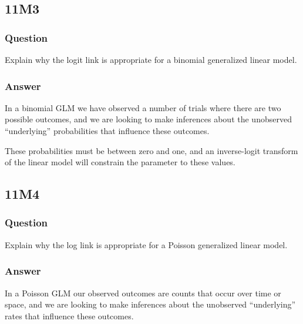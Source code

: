 \documentclass[
]{book}
\begin{document}
\hypertarget{m3-6}{%
\subsection*{11M3}\label{m3-6}}

\hypertarget{question-87}{%
\subsubsection*{Question}\label{question-87}}

Explain why the logit link is appropriate for a binomial generalized linear model.

\hypertarget{answer-87}{%
\subsubsection*{Answer}\label{answer-87}}

In a binomial GLM we have observed a number of trials where there are two possible outcomes, and we are looking to make inferences about the unobserved ``underlying'' probabilities that influence these outcomes.

These probabilities must be between zero and one, and an inverse-logit transform of the linear model will constrain the parameter to these values.

\hypertarget{m4-4}{%
\subsection*{11M4}\label{m4-4}}

\hypertarget{question-88}{%
\subsubsection*{Question}\label{question-88}}

Explain why the log link is appropriate for a Poisson generalized linear model.

\hypertarget{answer-88}{%
\subsubsection*{Answer}\label{answer-88}}

In a Poisson GLM our observed outcomes are counts that occur over time or space, and we are looking to make inferences about the unobserved ``underlying'' rates that influence these outcomes.
\end{document}
